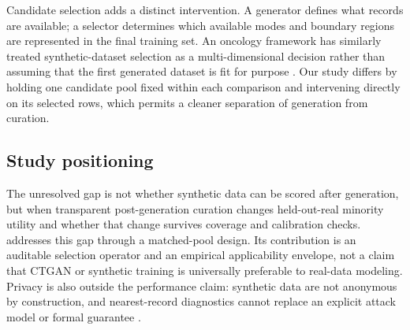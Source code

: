 Candidate selection adds a distinct intervention. A generator defines what records are available; a selector determines which available modes and boundary regions are represented in the final training set. An oncology framework has similarly treated synthetic-dataset selection as a multi-dimensional decision rather than assuming that the first generated dataset is fit for purpose \citep{christoforou2025}. Our study differs by holding one candidate pool fixed within each comparison and intervening directly on its selected rows, which permits a cleaner separation of generation from curation.

\subsection{Study positioning}

The unresolved gap is not whether synthetic data can be scored after generation, but when transparent post-generation curation changes held-out-real minority utility and whether that change survives coverage and calibration checks. \sepa{} addresses this gap through a matched-pool design. Its contribution is an auditable selection operator and an empirical applicability envelope, not a claim that CTGAN or synthetic training is universally preferable to real-data modeling. Privacy is also outside the performance claim: synthetic data are not anonymous by construction, and nearest-record diagnostics cannot replace an explicit attack model or formal guarantee \citep{yale2019,dwork2006}.
